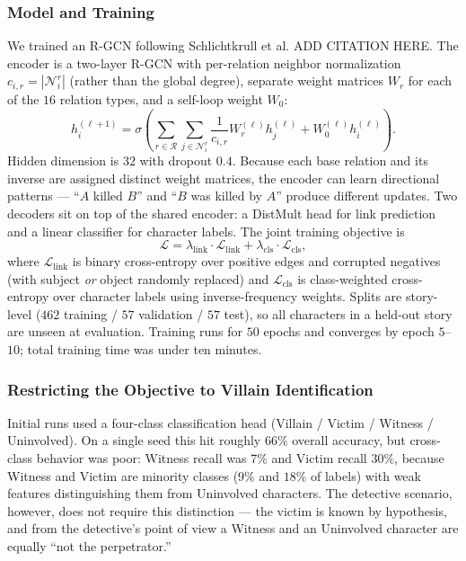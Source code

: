 \documentclass[11pt]{article}
\theoremstyle{definition}
\begin{document}
\subsubsection{Model and Training}
We trained an R-GCN following Schlichtkrull et al. \cite{}  ADD CITATION HERE. The encoder is a two-layer R-GCN with per-relation neighbor normalization $c_{i,r} = |\mathcal{N}_i^r|$ (rather than the global degree), separate weight matrices $W_r$ for each of the $16$ relation types, and a self-loop weight $W_0$:
\[
    h_i^{(\ell+1)}
    = \sigma\!\left(
        \sum_{r \in \mathcal{R}}
        \sum_{j \in \mathcal{N}_i^r}
        \frac{1}{c_{i,r}} W_r^{(\ell)} h_j^{(\ell)}
        + W_0^{(\ell)} h_i^{(\ell)}
      \right).
\]
Hidden dimension is $32$ with dropout $0.4$. Because each base relation and its inverse are assigned distinct weight matrices, the encoder can learn directional patterns --- ``$A$ killed $B$'' and ``$B$ was killed by $A$'' produce different updates. Two decoders sit on top of the shared encoder: a DistMult head for link prediction and a linear classifier for character labels. The joint training objective is
\[
    \mathcal{L}
    = \lambda_{\text{link}} \cdot \mathcal{L}_{\text{link}}
    + \lambda_{\text{cls}} \cdot \mathcal{L}_{\text{cls}},
\]
where $\mathcal{L}_{\text{link}}$ is binary cross-entropy over positive edges and corrupted negatives (with subject \emph{or} object randomly replaced) and $\mathcal{L}_{\text{cls}}$ is class-weighted cross-entropy over character labels using inverse-frequency weights. Splits are story-level ($462$ training / $57$ validation / $57$ test), so all characters in a held-out story are unseen at evaluation. Training runs for $50$ epochs and converges by epoch $5$--$10$; total training time was under ten minutes.

\subsubsection{Restricting the Objective to Villain Identification}
Initial runs used a four-class classification head (Villain / Victim / Witness / Uninvolved). On a single seed this hit roughly $66\%$ overall accuracy, but cross-class behavior was poor: Witness recall was $7\%$ and Victim recall $30\%$, because Witness and Victim are minority classes ($9\%$ and $18\%$ of labels) with weak features distinguishing them from Uninvolved characters. The detective scenario, however, does not require this distinction --- the victim is known by hypothesis, and from the detective's point of view a Witness and an Uninvolved character are equally ``not the perpetrator.''
\end{document}
